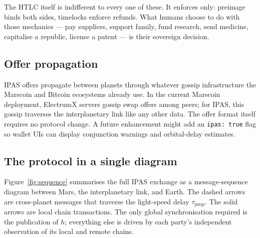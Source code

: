 \documentclass[11pt]{article}
\begin{document}
The HTLC itself is indifferent to every one of these. It enforces only: preimage binds both sides, timelocks enforce refunds. What humans choose to do with those mechanics --- pay suppliers, support family, fund research, send medicine, capitalise a republic, license a patent --- is their sovereign decision.

\subsection{Offer propagation}

IPAS offers propagate between planets through whatever gossip infrastructure the Marscoin and Bitcoin ecosystems already use. In the current Marscoin deployment, ElectrumX servers gossip swap offers among peers; for IPAS, this gossip traverses the interplanetary link like any other data. The offer format itself requires no protocol change. A future enhancement might add an \texttt{ipas: true} flag so wallet UIs can display conjunction warnings and orbital-delay estimates.

\subsection{The protocol in a single diagram}

Figure~\ref{fig:sequence} summarises the full IPAS exchange as a message-sequence diagram between Mars, the interplanetary link, and Earth. The dashed arrows are cross-planet messages that traverse the light-speed delay $\tau_{\text{prop}}$. The solid arrows are local chain transactions. The only global synchronisation required is the publication of $h$; everything else is driven by each party's independent observation of its local and remote chains.
\end{document}
